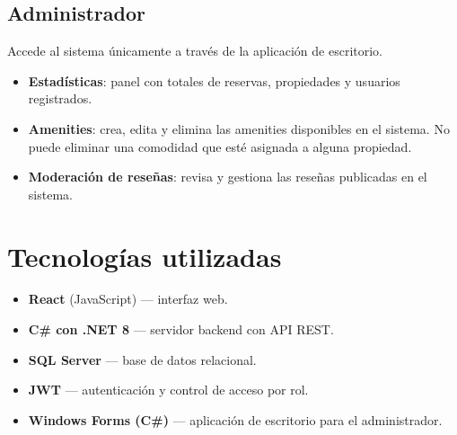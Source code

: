 \documentclass[12pt,a4paper]{article}
\begin{document}
\subsection{Administrador}

Accede al sistema únicamente a través de la aplicación de escritorio.

\begin{itemize}[leftmargin=1.5em]
  \item \textbf{Estadísticas}: panel con totales de reservas, propiedades y usuarios registrados.
  \item \textbf{Amenities}: crea, edita y elimina las amenities disponibles en el sistema. No puede eliminar una comodidad que esté asignada a alguna propiedad.
  \item \textbf{Moderación de reseñas}: revisa y gestiona las reseñas publicadas en el sistema.
\end{itemize}

\section{Tecnologías utilizadas}

\begin{itemize}[leftmargin=1.5em]
  \item \textbf{React} (JavaScript) — interfaz web.
  \item \textbf{C\# con .NET 8} — servidor backend con API REST.
  \item \textbf{SQL Server} — base de datos relacional.
  \item \textbf{JWT} — autenticación y control de acceso por rol.
  \item \textbf{Windows Forms (C\#)} — aplicación de escritorio para el administrador.
\end{itemize}
\end{document}
